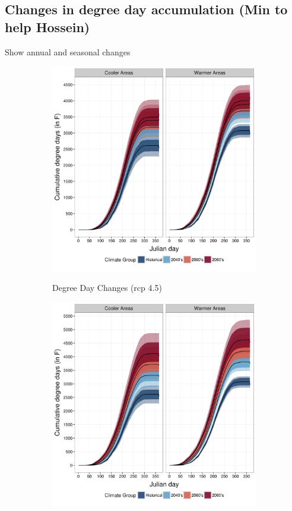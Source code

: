 \documentclass[12pt]{article}
\theoremstyle{plain}
\theoremstyle{definition}
\theoremstyle{definition}
\begin{document}
\subsection{Changes in degree day accumulation (Min to help Hossein)}
Show annual and seasonal changes

\iffalse
\begin{figure}[h!]
\begin{subfigure}{.46\textwidth}
  \centering
  \includegraphics[width=1\linewidth]{figures/plot_cumdd_rcp45}
  \label{fig:DDC45}
\caption{Degree Day Changes (rcp 4.5)}
\end{subfigure}\hfill
\begin{subfigure}{.46\textwidth}
  \centering
  \includegraphics[width=1\linewidth]{figures/plot_cumdd_rcp85}

\end{subfigure}
\end{figure}
\end{document}
